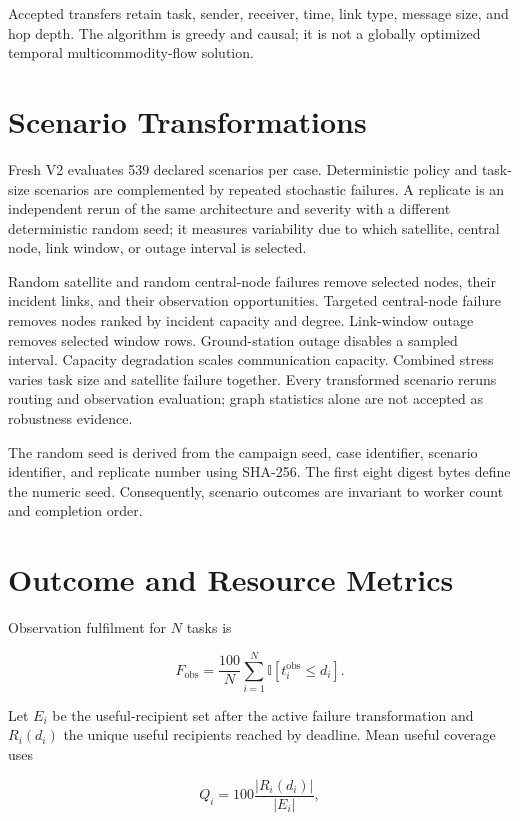 Accepted transfers retain task, sender, receiver, time, link type, message size, and hop depth. The algorithm is greedy and causal; it is not a globally optimized temporal multicommodity-flow solution.

\section{Scenario Transformations}

Fresh V2 evaluates 539 declared scenarios per case. Deterministic policy and task-size scenarios are complemented by repeated stochastic failures. A replicate is an independent rerun of the same architecture and severity with a different deterministic random seed; it measures variability due to which satellite, central node, link window, or outage interval is selected.

Random satellite and random central-node failures remove selected nodes, their incident links, and their observation opportunities. Targeted central-node failure removes nodes ranked by incident capacity and degree. Link-window outage removes selected window rows. Ground-station outage disables a sampled interval. Capacity degradation scales communication capacity. Combined stress varies task size and satellite failure together. Every transformed scenario reruns routing and observation evaluation; graph statistics alone are not accepted as robustness evidence.

The random seed is derived from the campaign seed, case identifier, scenario identifier, and replicate number using SHA-256. The first eight digest bytes define the numeric seed. Consequently, scenario outcomes are invariant to worker count and completion order.

\section{Outcome and Resource Metrics}

Observation fulfilment for $N$ tasks is

\begin{equation}
F_{\mathrm{obs}}=\frac{100}{N}\sum_{i=1}^{N}\mathbb{I}[t_i^{\mathrm{obs}}\le d_i].
\end{equation}

Let $E_i$ be the useful-recipient set after the active failure transformation and $R_i(d_i)$ the unique useful recipients reached by deadline. Mean useful coverage uses

\begin{equation}
Q_i=100\frac{|R_i(d_i)|}{|E_i|},
\end{equation}

